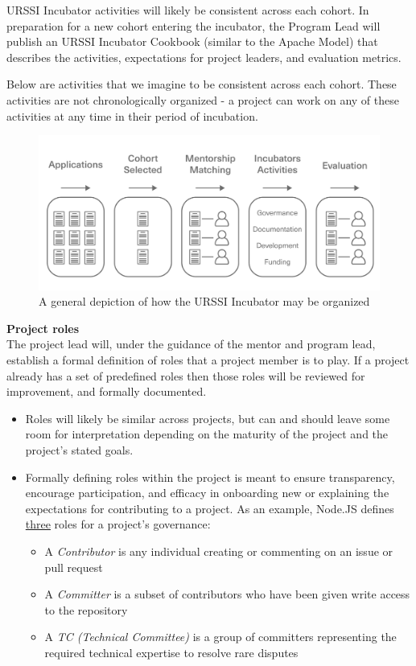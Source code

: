 \documentclass[
]{book}
\providecommand{\tightlist}{%
  \setlength{\itemsep}{0pt}\setlength{\parskip}{0pt}}
\begin{document}
URSSI Incubator activities will likely be consistent across each cohort.
In preparation for a new cohort entering the incubator, the Program Lead will publish an URSSI Incubator Cookbook (similar to the Apache Model) that describes the activities, expectations for project leaders, and evaluation metrics.

Below are activities that we imagine to be consistent across each cohort.
These activities are not chronologically organized - a project can work on any of these activities at any time in their period of incubation.

\begin{figure}
\centering
\includegraphics{images/URSSI-Incubator.jpg}
\caption{A general depiction of how the URSSI Incubator may be organized}
\end{figure}

\textbf{Project roles}\\
The project lead will, under the guidance of the mentor and program lead, establish a formal definition of roles that a project member is to play.
If a project already has a set of predefined roles then those roles will be reviewed for improvement, and formally documented.

\begin{itemize}
\tightlist
\item
  Roles will likely be similar across projects, but can and should leave some room for interpretation depending on the maturity of the project and the project's stated goals.
\item
  Formally defining roles within the project is meant to ensure transparency, encourage participation, and efficacy in onboarding new or explaining the expectations for contributing to a project. As an example, Node.JS defines \href{https://medium.com/the-node-js-collection/healthy-open-source-967fa8be7951}{three} roles for a project's governance:

  \begin{itemize}
  \tightlist
  \item
    A \emph{Contributor} is any individual creating or commenting on an issue or pull request
  \item
    A \emph{Committer} is a subset of contributors who have been given write access to the repository
  \item
    A \emph{TC (Technical Committee)} is a group of committers representing the required technical expertise to resolve rare disputes
  \end{itemize}
\end{itemize}
\end{document}
